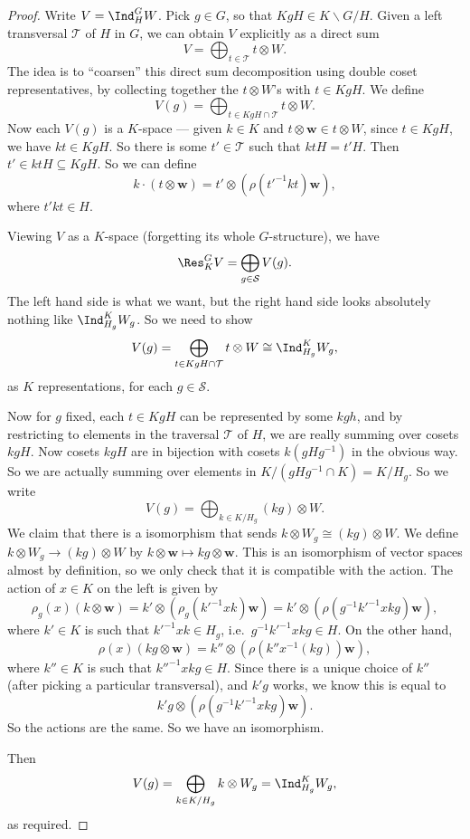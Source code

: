 \documentclass[a4paper]{article}
\begin{document}
\begin{proof}
  Write $V = \Ind_H^G W$. Pick $g \in G$, so that $KgH \in K \backslash G / H$. Given a left transversal $\mathcal{T}$ of $H$ in $G$, we can obtain $V$ explicitly as a direct sum
  \[
    V = \bigoplus_{t \in \mathcal{T}} t\otimes W.
  \]
  The idea is to ``coarsen'' this direct sum decomposition using double coset representatives, by collecting together the $t\otimes W$'s with $t \in KgH$. We define
  \[
    V(g) = \bigoplus_{t \in KgH \cap \mathcal{T}} t\otimes W.
  \]
  Now each $V(g)$ is a $K$-space --- given $k \in K$ and $t \otimes \mathbf{w} \in t \otimes W$, since $t \in KgH$, we have $kt \in KgH$. So there is some $t' \in \mathcal{T}$ such that $ktH = t' H$. Then $t' \in ktH \subseteq KgH$. So we can define
  \[
    k \cdot (t \otimes \mathbf{w}) = t' \otimes (\rho(t'^{-1} kt) \mathbf{w}),
  \]
  where $t'kt \in H$.

  Viewing $V$ as a $K$-space (forgetting its whole $G$-structure), we have
  \[
    \Res_K^G V = \bigoplus_{g \in \mathcal{S}} V(g).
  \]
  The left hand side is what we want, but the right hand side looks absolutely nothing like $\Ind_{H_g}^K W_g$. So we need to show
  \[
    V(g) = \bigoplus_{t \in KgH \cap \mathcal{T}} t\otimes W \cong \Ind_{H_g}^K W_g,
  \]
  as $K$ representations, for each $g \in \mathcal{S}$.

  Now for $g$ fixed, each $t \in KgH$ can be represented by some $kgh$, and by restricting to elements in the traversal $\mathcal{T}$ of $H$, we are really summing over cosets $kgH$. Now cosets $kgH$ are in bijection with cosets $k(gHg^{-1})$ in the obvious way. So we are actually summing over elements in $K/(gHg^{-1} \cap K) = K/H_g$. So we write
  \[
    V(g) = \bigoplus_{k \in K/H_g} (kg)\otimes W.
  \]
  We claim that there is a isomorphism that sends $k \otimes W_g \cong (kg) \otimes W$. We define $k \otimes W_g \to (kg) \otimes W$ by $k \otimes \mathbf{w} \mapsto kg \otimes \mathbf{w}$. This is an isomorphism of vector spaces almost by definition, so we only check that it is compatible with the action. The action of $x \in K$ on the left is given by
  \[
    \rho_g(x) (k \otimes \mathbf{w}) = k' \otimes (\rho_g(k'^{-1} xk) \mathbf{w}) = k' \otimes (\rho(g^{-1} k'^{-1} xkg) \mathbf{w}),
  \]
  where $k' \in K$ is such that $k'^{-1} xk \in H_g$, i.e.\ $g^{-1} k'^{-1} xkg \in H$. On the other hand,
  \[
    \rho(x) (kg \otimes \mathbf{w}) = k'' \otimes (\rho (k'' x^{-1} (kg)) \mathbf{w}),
  \]
  where $k'' \in K$ is such that $k''^{-1} xkg \in H$. Since there is a unique choice of $k''$ (after picking a particular transversal), and $k' g$ works, we know this is equal to
  \[
    k' g \otimes (\rho(g^{-1} k'^{-1} xkg) \mathbf{w}).
  \]
  So the actions are the same. So we have an isomorphism.

  Then
  \[
    V(g) = \bigoplus_{k \in K/H_g} k \otimes W_g = \Ind_{H_g}^K W_g,
  \]
  as required.
\end{proof}
\end{document}
